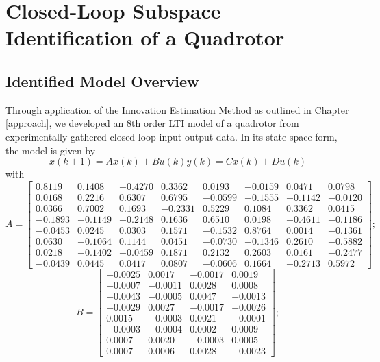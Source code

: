 \chapter{Closed-Loop Subspace Identification of a Quadrotor}\label{results}

\section{Identified Model Overview}
Through application of the Innovation Estimation Method as outlined in Chapter \ref{approach}, we developed an 8th order LTI model of a quadrotor from experimentally gathered closed-loop input-output data. In its state space form, the model is given by
\begin{subequations}\label{eq:2_lti}
\begin{equation*}x(k+1) = Ax(k) + Bu(k)\end{equation*}
\begin{equation*}y(k) = Cx(k) + Du(k)\end{equation*}
\end{subequations}
with
\footnotesize %
\begin{equation*}
A = \begin{bmatrix}
0.8119&0.1408&-0.4270&0.3362&0.0193&-0.0159&0.0471&0.0798\\
0.0168&0.2216&0.6307&0.6795&-0.0599&-0.1555&-0.1142&-0.0120\\
0.0366&0.7002&0.1693&-0.2331&0.5229&0.1084&0.3362&0.0415\\
-0.1893&-0.1149&-0.2148&0.1636&0.6510&0.0198&-0.4611&-0.1186\\
-0.0453&0.0245&0.0303&0.1571&-0.1532&0.8764&0.0014&-0.1361\\
0.0630&-0.1064&0.1144&0.0451&-0.0730&-0.1346&0.2610&-0.5882\\
0.0218&-0.1402&-0.0459&0.1871&0.2132&0.2603&0.0161&-0.2477\\
-0.0439&0.0445&0.0417&0.0807&-0.0606&0.1664&-0.2713&0.5972
\end{bmatrix};
\end{equation*}
\begin{equation*}
B = \begin{bmatrix}
   -0.0025&0.0017&-0.0017&0.0019\\
   -0.0007&-0.0011&0.0028&0.0008\\
   -0.0043&-0.0005&0.0047&-0.0013\\
   -0.0029&0.0027&-0.0017&-0.0026\\
    0.0015&-0.0003&0.0021&-0.0001\\
   -0.0003&-0.0004&0.0002&0.0009\\
    0.0007&0.0020&-0.0003&0.0005\\
    0.0007&0.0006&0.0028&-0.0023
\end{bmatrix};
\end{equation*}   
